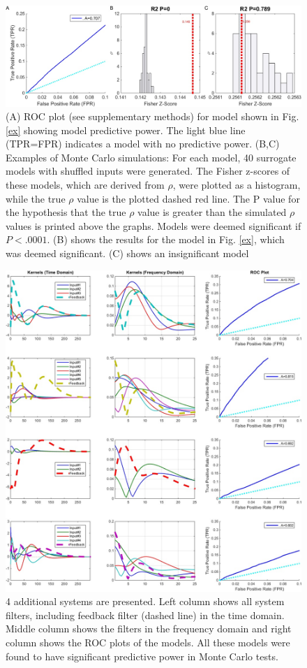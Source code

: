 \documentclass[11pt,a4paper,final]{article}
\begin{document}
\begin{figure}[!ht]
\centering
\includegraphics[width=150mm]{SFMCsig}
\caption[MonteCarlo Significance Results]{
(A) ROC plot (see supplementary methods) for model shown in Fig. \ref{ex} showing model predictive power. The light blue line (TPR=FPR) indicates a model with no predictive power.
(B,C) Examples of Monte Carlo simulations: For each model, 40 surrogate models with shuffled inputs were generated. The Fisher z-scores of these models, which are derived from $\rho$,  were plotted as a histogram, while the true $\rho$ value is the plotted dashed red line. The P value for the hypothesis that the true $\rho$ value is greater than the simulated $\rho$ values is printed above the graphs. Models were deemed significant if $P<.0001$. (B) shows the results for the model in Fig. \ref{ex}, which was deemed significant. (C) shows an insignificant model}
\label{SFMCsig}
\end{figure}

\begin{figure}[!ht]
\centering
\includegraphics[width=150mm]{SF_MVARxtra}
\caption[Additional System Examples]{
4 additional systems are presented.
Left column shows all system filters, including feedback filter (dashed line) in the time domain.
Middle column shows the filters in the frequency domain and right column shows the ROC plots of the models.
All these models were found to have significant predictive power in Monte Carlo tests.}
\label{SF_MVARxtra}
\end{figure}
\end{document}
